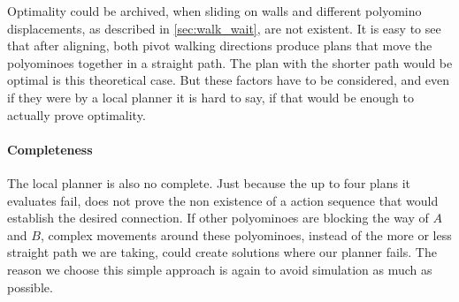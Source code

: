 Optimality could be archived, when sliding on walls and different polyomino displacements, as described in \autoref{sec:walk_wait}, are not existent.
It is easy to see that after aligning, both pivot walking directions produce plans that move the polyominoes together in a straight path.
The plan with the shorter path would be optimal is this theoretical case.
But these factors have to be considered, and even if they were by a local planner it is hard to say, if that would be enough to actually prove optimality.

\paragraph{Completeness}

The local planner is also no complete.
Just because the up to four plans it evaluates fail, does not prove the non existence of a action sequence that would establish the desired connection.
If other polyominoes are blocking the way of $A$ and $B$, complex movements around these polyominoes, instead of the more or less straight path we are taking, could create solutions where our planner fails.
The reason we choose this simple approach is again to avoid simulation as much as possible. 








